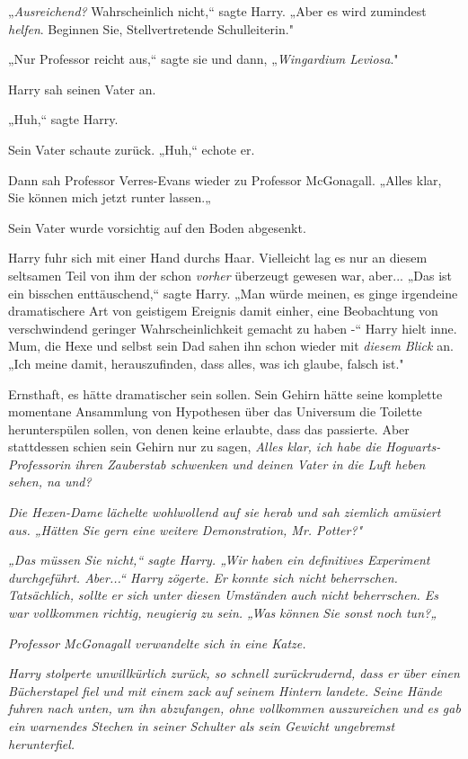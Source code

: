 {„\emph{Ausreichend?} Wahrscheinlich nicht,“ sagte Harry. „Aber es wird zumindest \emph{helfen}. Beginnen Sie, Stellvertretende Schulleiterin."

„Nur Professor reicht aus,“ sagte sie und dann, „\emph{Wingardium Leviosa}."

Harry sah seinen Vater an.

„Huh,“ sagte Harry.

Sein Vater schaute zurück. „Huh,“ echote er.

Dann sah Professor Verres-Evans wieder zu Professor McGonagall. „Alles klar, Sie können mich jetzt runter lassen.„

Sein Vater wurde vorsichtig auf den Boden abgesenkt.

Harry fuhr sich mit einer Hand durchs Haar. Vielleicht lag es nur an diesem seltsamen Teil von ihm der schon \emph{vorher} überzeugt gewesen war, aber... „Das ist ein bisschen enttäuschend,“ sagte Harry. „Man würde meinen, es ginge irgendeine dramatischere Art von geistigem Ereignis damit einher, eine Beobachtung von verschwindend geringer Wahrscheinlichkeit gemacht zu haben -“ Harry hielt inne. Mum, die Hexe und selbst sein Dad sahen ihn schon wieder mit \emph{diesem Blick} an. „Ich meine damit, herauszufinden, dass alles, was ich glaube, falsch ist."

Ernsthaft, es hätte dramatischer sein sollen. Sein Gehirn hätte seine komplette momentane Ansammlung von Hypothesen über das Universum die Toilette herunterspülen sollen, von denen keine erlaubte, dass das passierte. Aber stattdessen schien sein Gehirn nur zu sagen, \emph{Alles klar, ich habe die Hogwarts-Professorin ihren Zauberstab schwenken und deinen Vater in die Luft heben sehen, na und?}

\emph{Die Hexen-Dame lächelte wohlwollend auf sie herab und sah ziemlich amüsiert aus. „Hätten Sie gern eine weitere Demonstration, Mr. Potter?"}

\emph{„Das müssen Sie nicht,“ sagte Harry. „Wir haben ein definitives Experiment durchgeführt. Aber...“ Harry zögerte. Er konnte sich nicht beherrschen. Tatsächlich,} \emph{\emph{sollte}} \emph{er sich unter diesen Umständen auch nicht beherrschen. Es war vollkommen richtig, neugierig zu sein. „Was} \emph{\emph{können}} \emph{Sie sonst noch tun?„}

\emph{Professor McGonagall verwandelte sich in eine Katze.}

\emph{Harry stolperte unwillkürlich zurück, so schnell zurückrudernd, dass er über einen Bücherstapel fiel und mit einem} \emph{\emph{zack}} \emph{auf seinem Hintern landete. Seine Hände fuhren nach unten, um ihn abzufangen, ohne vollkommen auszureichen und es gab ein warnendes Stechen in seiner Schulter als sein Gewicht ungebremst herunterfiel.}

}
